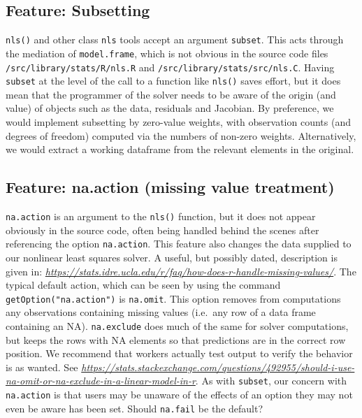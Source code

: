 \hypertarget{feature-subsetting}{%
\subsection{Feature: Subsetting}\label{feature-subsetting}}

\texttt{nls()} and other class \texttt{nls} tools accept an argument \texttt{subset}. This acts through
the mediation of \texttt{model.frame}, which is not obvious in the
source code files
\texttt{/src/library/stats/R/nls.R} and
\texttt{/src/library/stats/src/nls.C}.
Having \texttt{subset} at the level of the call to a function like
\texttt{nls()} saves effort, but it does mean that the programmer of the
solver needs to be aware of the
origin (and value) of objects such as the data, residuals and Jacobian.
By preference,
we would implement subsetting by zero-value weights, with observation counts
(and degrees of freedom) computed via the numbers of non-zero weights. Alternatively,
we would extract a working dataframe from the relevant elements in the original.

\hypertarget{feature-na.action-missing-value-treatment}{%
\subsection{Feature: na.action (missing value treatment)}\label{feature-na.action-missing-value-treatment}}

\texttt{na.action} is an argument to the \texttt{nls()} function, but it does not appear
obviously in the source code, often being handled behind the scenes after
referencing the option \texttt{na.action}. This feature also changes the data
supplied to our nonlinear least squares solver.
A useful, but possibly dated, description is given in:
\emph{\url{https://stats.idre.ucla.edu/r/faq/how-does-r-handle-missing-values/}}.
The typical default action, which can be seen by using the command
\texttt{getOption("na.action")}
is \texttt{na.omit}. This option removes from computations any observations
containing missing values (i.e.~any row of a data frame containing an NA).
\texttt{na.exclude} does much of the same for solver computations, but keeps the rows with
NA elements so that predictions are in the correct row position. We recommend that
workers actually test output to verify the behavior is as wanted.
See \emph{\url{https://stats.stackexchange.com/questions/492955/should-i-use-na-omit-or-na-exclude-in-a-linear-model-in-r}}.
As with \texttt{subset}, our concern with \texttt{na.action} is that users may be unaware of the
effects of an option they may not even be aware has been set. Should \texttt{na.fail} be the default?

